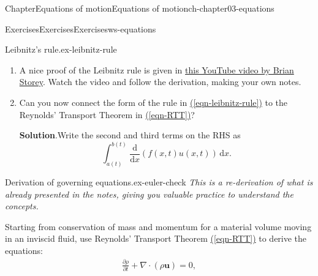 \documentclass[oneside,10pt,]{book}
\newcommand{\blocktitlefont}{\relax}
\newcommand{\xreffont}{\relax}
\numberwithin{equation}{section}
\newcommand{\de}{\mathrm{d}}
\newcommand{\dd}[2]{\frac{\de#1}{\de#2}}
\newcommand{\pd}[2]{\frac{\partial#1}{\partial#2}}
\newcommand{\bu}{\boldsymbol{u}}
\begin{document}
\begin{chapterptx}{Chapter}{Equations of motion}{}{Equations of motion}{}{}{ch-chapter03-equations}
\begin{exercises-section}{Exercises}{Exercises}{}{Exercises}{}{}{ws-equations}
\begin{divisionexercise}{3}{Leibnitz's rule.}{}{ex-leibnitz-rule}
\begin{enumerate}[font=\bfseries,label=(\alph*),ref=\alph*]
\begin{equation*}
\frac{1}{\Delta t} \int_{a(t)}^{b(t)} [f(x, t + \Delta t) - f(x, t)] \, \de{x}.
\end{equation*}
This is essentially the finite-difference version of the first term on the RHS.%
\par
The second circled element is associated with the quantity:%
\begin{equation*}
f(x, t)[a(t + \Delta t) - a(t)] \frac{1}{\Delta t},
\end{equation*}
and is associated with the area of the rectangle.%
\par
The third circled element is associated with%
\begin{equation*}
f(x, t + \Delta t)[b(t + \Delta t) - b(t)] \frac{1}{\Delta t},
\end{equation*}
and is associated with the area of the rectangle. Notice that for small \(\Delta t\), the rectangle height of \(f(x, t+\Delta t)\) is approximately the same as the rectangle height of \(f(x, t)\).%
\item{}A nice proof of the Leibnitz rule is given in \href{https://www.youtube.com/watch?v=zbWihK9ibhc}{this YouTube video by Brian Storey}. Watch the video and follow the derivation, making your own notes.%
\item{}Can you now connect the form of the rule in \hyperref[eqn-leibnitz-rule]{({\xreffont\ref{eqn-leibnitz-rule}})} to the Reynolds' Transport Theorem in \hyperref[eqn-RTT]{({\xreffont\ref{eqn-RTT}})}?%
\par\smallskip%
\noindent\textbf{\blocktitlefont Solution}.\hypertarget{ex-leibnitz-rule-5-2}{}\quad{}Write the second and third terms on the RHS as%
\begin{equation*}
\int_{a(t)}^{b(t)} \dd{}{x}(f(x, t) u(x, t)) \, \de{x}.
\end{equation*}
%
\end{enumerate}%
\end{divisionexercise}%
\begin{divisionexercise}{4}{Derivation of governing equations.}{}{ex-euler-check}%
\emph{This is a re-derivation of what is already presented in the notes, giving you valuable practice to understand the concepts.}%
\par
Starting from conservation of mass and momentum for a material volume moving in an inviscid fluid, use Reynolds' Transport Theorem \hyperref[eqn-RTT]{({\xreffont\ref{eqn-RTT}})} to derive the equations:%
\begin{gather}
\pd{\rho}{t} + \nabla \cdot(\rho \bu) = 0, \label{ex-euler-check-2-2-2-1}\\

\end{gather}
\end{divisionexercise}
\end{exercises-section}
\end{chapterptx}
\end{document}

